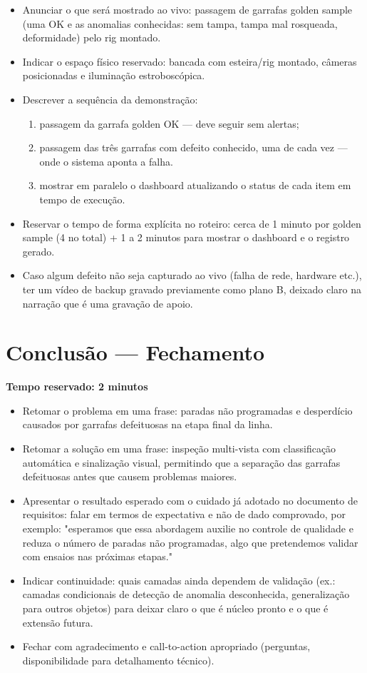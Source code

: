 \documentclass[12pt,a4paper]{report}
\begin{document}
\begin{itemize}
    \item Anunciar o que será mostrado ao vivo: passagem de garrafas golden sample (uma OK e as anomalias conhecidas: sem tampa, tampa mal rosqueada, deformidade) pelo rig montado.
    \item Indicar o espaço físico reservado: bancada com esteira/rig montado, câmeras posicionadas e iluminação estroboscópica.
    \item Descrever a sequência da demonstração:
    \begin{enumerate}
        \item passagem da garrafa golden OK — deve seguir sem alertas;
        \item passagem das três garrafas com defeito conhecido, uma de cada vez — onde o sistema aponta a falha.
        \item mostrar em paralelo o dashboard atualizando o status de cada item em tempo de execução.
    \end{enumerate}
    \item Reservar o tempo de forma explícita no roteiro: cerca de 1 minuto por golden sample (4 no total) + 1 a 2 minutos para mostrar o dashboard e o registro gerado.
    \item Caso algum defeito não seja capturado ao vivo (falha de rede, hardware etc.), ter um vídeo de backup gravado previamente como plano B, deixado claro na narração que é uma gravação de apoio.
\end{itemize}

\section{Conclusão — Fechamento}
\textbf{Tempo reservado: 2 minutos}

\begin{itemize}
    \item Retomar o problema em uma frase: paradas não programadas e desperdício causados por garrafas defeituosas na etapa final da linha.
    \item Retomar a solução em uma frase: inspeção multi-vista com classificação automática e sinalização visual, permitindo que a separação das garrafas defeituosas antes que causem problemas maiores.
    \item Apresentar o resultado esperado com o cuidado já adotado no documento de requisitos: falar em termos de expectativa e não de dado comprovado, por exemplo: "esperamos que essa abordagem auxilie no controle de qualidade e reduza o número de paradas não programadas, algo que pretendemos validar com ensaios nas próximas etapas."
    \item Indicar continuidade: quais camadas ainda dependem de validação (ex.: camadas condicionais de detecção de anomalia desconhecida, generalização para outros objetos) para deixar claro o que é núcleo pronto e o que é extensão futura.
    \item Fechar com agradecimento e call-to-action apropriado (perguntas, disponibilidade para detalhamento técnico).
\end{itemize}
\end{document}
